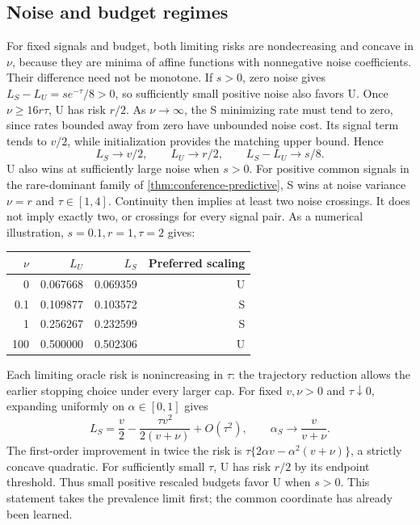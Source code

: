 \subsection{Noise and budget regimes}
\label{sec:oracle-noise-budget}

For fixed signals and budget, both limiting risks are nondecreasing and concave
in $\nu$, because they are minima of affine functions with nonnegative noise
coefficients. Their difference need not be monotone. If $s>0$, zero noise
gives $L_S-L_U=se^{-\tau}/8>0$, so sufficiently small positive noise also
favors U. Once $\nu\geq16r\tau$, U has risk $r/2$. As $\nu\to\infty$,
the S minimizing rate must tend to zero, since rates bounded away from zero
have unbounded noise cost. Its signal term tends to $v/2$, while initialization
provides the matching upper bound. Hence
\[
  L_S\longrightarrow v/2,\qquad L_U\longrightarrow r/2,
  \qquad L_S-L_U\longrightarrow s/8.
\]
U also wins at sufficiently large noise when $s>0$. For positive common
signals in the rare-dominant family of \cref{thm:conference-predictive}, S wins
at noise variance $\nu=r$ and $\tau\in[1,4]$. Continuity then implies at least
two noise crossings. It does not imply exactly two, or crossings for every
signal pair. As a numerical illustration, $s=0.1,r=1,\tau=2$ gives:
\begin{center}
  \begin{tabular}{rrrr}
    \toprule
    $\nu$ & $L_U$ & $L_S$ & Preferred scaling\\
    \midrule
    0 & 0.067668 & 0.069359 & U\\
    0.1 & 0.109877 & 0.103572 & S\\
    1 & 0.256267 & 0.232599 & S\\
    100 & 0.500000 & 0.502306 & U\\
    \bottomrule
  \end{tabular}
\end{center}

Each limiting oracle risk is nonincreasing in $\tau$: the trajectory reduction
allows the earlier stopping choice under every larger cap. For fixed
$v,\nu>0$ and $\tau\downarrow0$, expanding uniformly on $\alpha\in[0,1]$
gives
\[
  L_S=\frac v2-\frac{\tau v^2}{2(v+\nu)}+O(\tau^2),\qquad
  \alpha_S\longrightarrow\frac{v}{v+\nu}.
\]
The first-order improvement in twice the risk is
$\tau\{2\alpha v-\alpha^2(v+\nu)\}$, a strictly concave quadratic.
For sufficiently small $\tau$, U has risk $r/2$ by its endpoint threshold.
Thus small positive rescaled budgets favor U when $s>0$. This statement takes
the prevalence limit first; the common coordinate has already been learned.

